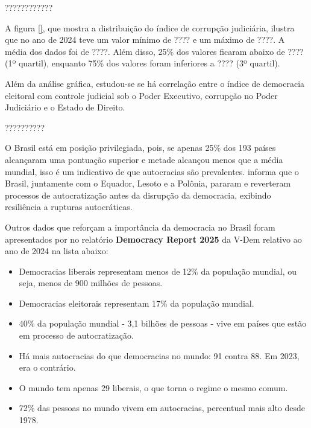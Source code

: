 ????????????


A figura \ref{}, que mostra a distribuição do índice de corrupção judiciária, ilustra que no ano de 2024 teve um valor mínimo de ???? e um máximo de ????. A média dos dados foi de ????. Além disso, 25\% dos valores ficaram abaixo de ???? (1º quartil), enquanto 75\% dos valores foram inferiores a ???? (3º quartil).

Além da análise gráfica, estudou-se se há correlação entre o índice de democracia eleitoral com controle judicial sob o Poder Executivo,  corrupção no Poder Judiciário e o Estado de Direito.

??????????

O Brasil está em posição privilegiada, pois, se apenas 25\% dos 193 países alcançaram uma pontuação superior e metade alcançou menos que a média mundial, isso é um indicativo de que autocracias são prevalentes. \cite{nord2025democracy} informa que o Brasil, juntamente com o Equador, Lesoto e a Polônia, pararam e reverteram processos de autocratização antes da disrupção da democracia, exibindo resiliência a rupturas autocráticas.

Outros dados que reforçam a importância da democracia no Brasil foram apresentados por \cite{nord2025democracy} no relatório \textbf{Democracy Report 2025} da V-Dem relativo ao ano de 2024 na lista abaixo:

\begin{itemize}
    \item Democracias liberais representam menos de 12\% da população mundial, ou seja, menos de 900 milhões de pessoas.
    \item Democracias eleitorais representam 17\% da população mundial.
    \item 40\%  da população mundial - 3,1 bilhões de pessoas - vive em países que estão em processo de autocratização.
    \item Há mais autocracias do que democracias no mundo: 91 contra 88. Em 2023, era o contrário.
    \item O mundo tem apenas 29 liberais, o que torna o regime o mesmo comum.
    \item 72\% das pessoas no mundo vivem em autocracias, percentual mais alto desde 1978.
\end{itemize}

